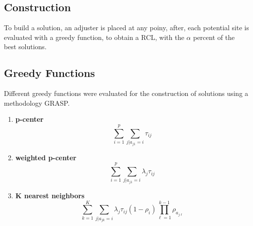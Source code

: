 \subsection{Construction}
\begin{frame}
  To build a solution, an adjuster is placed at any poiny, after,
  each potential site is evaluated with a greedy function, to obtain a RCL,
  with the $\alpha$ percent of the best solutions.
\end{frame}


\subsection{Greedy Functions}
\begin{frame}
  Different greedy functions were evaluated for the construction of solutions using a methodology GRASP.
  \begin{enumerate}
  \item \textbf{p-center} 
    \begin{equation}
      \sum_{i=1}^{p}{\sum_{j|a_{j1}=i}{\tau_{ij}}}
    \end{equation}
  \item \textbf{weighted p-center} 
    \begin{equation}
      \sum_{i=1}^{p}{\sum_{j|a_{j1}=i}{\lambda_{j}\tau_{ij}}}
    \end{equation}
  \item \textbf{K nearest neighbors}
    \begin{equation}
      \sum_{k=1}^K{\sum_{j|a_{jk}=i}{\lambda_{j}\tau_{ij}(1-\rho_i)\prod_{\ell=1}^{k-1}{\rho_{a_{j\ell}}}}}
    \end{equation}
  \end{enumerate}
\end{frame}

